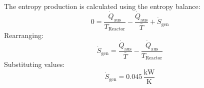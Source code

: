 The entropy production is calculated using the entropy balance:  
\[
0 = \frac{\dot{Q}_{\text{aus}}}{T_{\text{Reactor}}} - \frac{\dot{Q}_{\text{aus}}}{\bar{T}} + \dot{S}_{\text{gen}}
\]  
Rearranging:  
\[
\dot{S}_{\text{gen}} = \frac{\dot{Q}_{\text{aus}}}{\bar{T}} - \frac{\dot{Q}_{\text{aus}}}{T_{\text{Reactor}}}
\]  
Substituting values:  
\[
\dot{S}_{\text{gen}} = 0.045 \, \frac{\text{kW}}{\text{K}}
\]